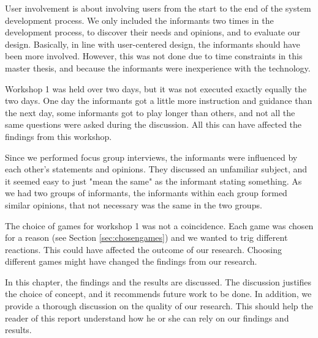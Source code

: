 User involvement is about involving users from the start to the end of the system development process. We only included the informants two times in the development process, to discover their needs and opinions, and to evaluate our design. Basically, in line with user-centered design, the informants should have been more involved. However, this was not done due to time constraints in this master thesis, and because the informants were inexperience with the technology. 

Workshop 1 was held over two days, but it was not executed exactly equally the two days. One day the informants got a little more instruction and guidance than the next day, some informants got to play longer than others, and not all the same questions were asked during the discussion. All this can have affected the findings from this workshop.  

Since we performed focus group interviews, the informants were influenced by each other's statements and opinions. They discussed an unfamiliar subject, and it seemed easy to just "mean the same" as the informant stating something. As we had two groups of informants, the informants within each group formed similar opinions, that not necessary was the same in the two groups.
   
The choice of games for workshop 1 was not a coincidence. Each game was chosen for a reason (see Section \ref{sec:chosengames}) and we wanted to trig different reactions. This could have affected the outcome of our research. Choosing different games might have changed the findings from our research. 

In this chapter, the findings and the results are discussed. The discussion justifies the choice of concept, and it recommends future work to be done. In addition, we provide a thorough discussion on the quality of our research. This should help the reader of this report understand how he or she can rely on our findings and results.


